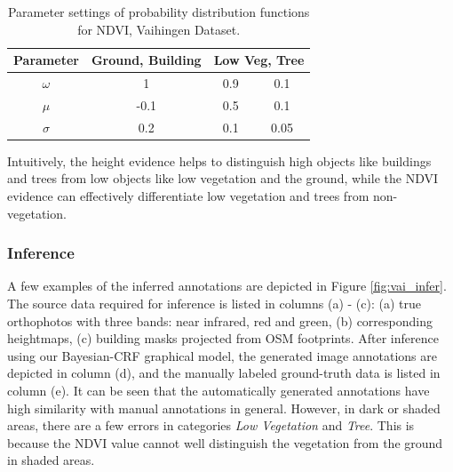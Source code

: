 \begin{table}[htbp]
  \centering
  \caption{Parameter settings of probability distribution functions for NDVI, Vaihingen Dataset.}
    \begin{tabular}{c|c|c|c}
    \hline
    \textbf{Parameter} & \textbf{Ground}, \textbf{Building} & \multicolumn{2}{c}{\textbf{Low Veg}, \textbf{Tree}} \\
          
    \hline
    $\omega$     & 1       & 0.9   & 0.1 \\
    
    $\mu$     & -0.1        & 0.5   & 0.1 \\
    
    $\sigma$ & 0.2      & 0.1   & 0.05 \\
    \hline
    \end{tabular}%
  \label{tab:vai_para_ndvi}%
\end{table}%

Intuitively, the height evidence helps to distinguish high objects like buildings and trees from low objects like low vegetation and the ground, while the NDVI evidence can effectively differentiate low vegetation and trees from non-vegetation.

\subsubsection{Inference}
A few examples of the inferred annotations are depicted in Figure \ref{fig:vai_infer}. The source data required for inference is listed in columns (a) - (c): (a) true orthophotos with three bands: near infrared, red and green, (b) corresponding heightmaps, (c) building masks projected from OSM footprints. After inference using our Bayesian-CRF graphical model, the generated image annotations are depicted in column (d), and the manually labeled ground-truth data is listed in column (e). It can be seen that the automatically generated annotations have high similarity with manual annotations in general. However, in dark or shaded areas, there are a few errors in categories \textit{Low Vegetation} and \textit{Tree}. This is because the NDVI value cannot well distinguish the vegetation from the ground in shaded areas. 


